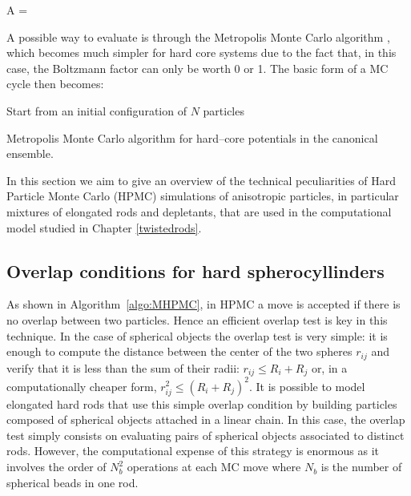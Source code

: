 \beq
\langle  A \rangle = 
\label{observable}
\eeq

A possible way to evaluate  is through the Metropolis Monte Carlo algorithm \cite{Metropolis1953}, which becomes much simpler for hard core systems due to the fact that, in this case, the Boltzmann factor can only be worth 0 or 1. The basic form of a MC cycle then becomes:


\begin{algorithm}[h]
    \SetAlgoLined

    Start from an initial configuration of $N$ particles\;
    \caption{Metropolis Monte Carlo algorithm for hard--core potentials in the canonical ensemble.}
    \label{algo:MHPMC}
\end{algorithm}


In this section we aim to give an overview of the technical peculiarities of Hard Particle Monte Carlo (HPMC) simulations of anisotropic particles, in particular mixtures of elongated rods and depletants, that are used in the computational model studied in Chapter \ref{twistedrods}.

\subsection{Overlap conditions for hard spherocyllinders}

As shown in Algorithm~\ref{algo:MHPMC}, in HPMC a move is accepted if there is no overlap between two particles. Hence an efficient overlap test is key in this technique. In the case of spherical objects the overlap test is very simple: it is enough to compute the distance between the center of the two spheres $r_{ij}$ and verify that it is less than the sum of their radii: $r_{ij} \leqslant R_i + R_j$ or, in a computationally cheaper form, $r_{ij}^2 \leqslant (R_i + R_j)^2$. It is possible to model elongated hard rods that use this simple overlap condition by building particles composed of spherical objects attached in a linear chain. In this case, the overlap test simply consists on evaluating pairs of spherical objects associated to distinct rods. However, the computational expense of this strategy is enormous as it involves the order of $N_b^2$ operations at each MC move where $N_b$ is the number of spherical beads in one rod.

